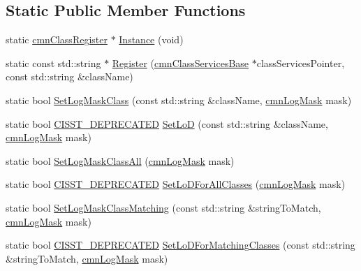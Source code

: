 \subsection*{Static Public Member Functions}
\begin{DoxyCompactItemize}
\item 
static \hyperlink{classcmn_class_register}{cmn\+Class\+Register} $\ast$ \hyperlink{classcmn_class_register_a086f22c4834c690b93f24704d4cfd936}{Instance} (void)
\item 
static const std\+::string $\ast$ \hyperlink{classcmn_class_register_ac4d2419b95d57656282fcc33dad76f31}{Register} (\hyperlink{classcmn_class_services_base}{cmn\+Class\+Services\+Base} $\ast$class\+Services\+Pointer, const std\+::string \&class\+Name)
\item 
static bool \hyperlink{classcmn_class_register_a9bbfe2c4a0d388c508d3db7e5ce87375}{Set\+Log\+Mask\+Class} (const std\+::string \&class\+Name, \hyperlink{cmn_log_lo_d_8h_a44b6ef7560b0d204460b0a54f1a5d702}{cmn\+Log\+Mask} mask)
\item 
static bool \hyperlink{cmn_portability_8h_a63da7164735f9501be651b1f2bbc0121}{C\+I\+S\+S\+T\+\_\+\+D\+E\+P\+R\+E\+C\+A\+T\+E\+D} \hyperlink{classcmn_class_register_ad2190c286fb8d1b52d7b2a8483df1551}{Set\+Lo\+D} (const std\+::string \&class\+Name, \hyperlink{cmn_log_lo_d_8h_a44b6ef7560b0d204460b0a54f1a5d702}{cmn\+Log\+Mask} mask)
\item 
static bool \hyperlink{classcmn_class_register_ab84a1a900a54b94c4c6d512acf152ebe}{Set\+Log\+Mask\+Class\+All} (\hyperlink{cmn_log_lo_d_8h_a44b6ef7560b0d204460b0a54f1a5d702}{cmn\+Log\+Mask} mask)
\item 
static bool \hyperlink{cmn_portability_8h_a63da7164735f9501be651b1f2bbc0121}{C\+I\+S\+S\+T\+\_\+\+D\+E\+P\+R\+E\+C\+A\+T\+E\+D} \hyperlink{classcmn_class_register_aa6781144fc60198e69ecd54afdc02afd}{Set\+Lo\+D\+For\+All\+Classes} (\hyperlink{cmn_log_lo_d_8h_a44b6ef7560b0d204460b0a54f1a5d702}{cmn\+Log\+Mask} mask)
\item 
static bool \hyperlink{classcmn_class_register_afc0d014a73ac6cdbc8f3f9b490cafcd9}{Set\+Log\+Mask\+Class\+Matching} (const std\+::string \&string\+To\+Match, \hyperlink{cmn_log_lo_d_8h_a44b6ef7560b0d204460b0a54f1a5d702}{cmn\+Log\+Mask} mask)
\item 
static bool \hyperlink{cmn_portability_8h_a63da7164735f9501be651b1f2bbc0121}{C\+I\+S\+S\+T\+\_\+\+D\+E\+P\+R\+E\+C\+A\+T\+E\+D} \hyperlink{classcmn_class_register_a1b46cd31e03253c910612c6d73eb5d60}{Set\+Lo\+D\+For\+Matching\+Classes} (const std\+::string \&string\+To\+Match, \hyperlink{cmn_log_lo_d_8h_a44b6ef7560b0d204460b0a54f1a5d702}{cmn\+Log\+Mask} mask)

\end{DoxyCompactItemize}
